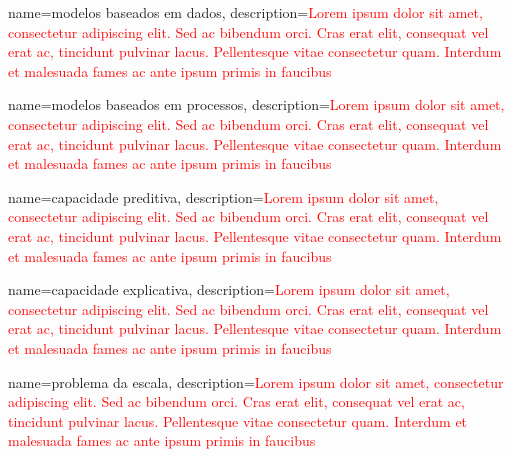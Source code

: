 {
    name=modelos baseados em dados,
    description={\textcolor{red}{Lorem ipsum dolor sit amet, consectetur adipiscing elit. Sed ac bibendum orci. Cras erat elit, consequat vel erat ac, tincidunt pulvinar lacus. Pellentesque vitae consectetur quam. Interdum et malesuada fames ac ante ipsum primis in faucibus}}
}

{
    name=modelos baseados em processos,
    description={\textcolor{red}{Lorem ipsum dolor sit amet, consectetur adipiscing elit. Sed ac bibendum orci. Cras erat elit, consequat vel erat ac, tincidunt pulvinar lacus. Pellentesque vitae consectetur quam. Interdum et malesuada fames ac ante ipsum primis in faucibus}}
}

{
    name=capacidade preditiva,
    description={\textcolor{red}{Lorem ipsum dolor sit amet, consectetur adipiscing elit. Sed ac bibendum orci. Cras erat elit, consequat vel erat ac, tincidunt pulvinar lacus. Pellentesque vitae consectetur quam. Interdum et malesuada fames ac ante ipsum primis in faucibus}}
}

{
    name=capacidade explicativa,
    description={\textcolor{red}{Lorem ipsum dolor sit amet, consectetur adipiscing elit. Sed ac bibendum orci. Cras erat elit, consequat vel erat ac, tincidunt pulvinar lacus. Pellentesque vitae consectetur quam. Interdum et malesuada fames ac ante ipsum primis in faucibus}}
}

{
    name=problema da escala,
    description={\textcolor{red}{Lorem ipsum dolor sit amet, consectetur adipiscing elit. Sed ac bibendum orci. Cras erat elit, consequat vel erat ac, tincidunt pulvinar lacus. Pellentesque vitae consectetur quam. Interdum et malesuada fames ac ante ipsum primis in faucibus}}
}

